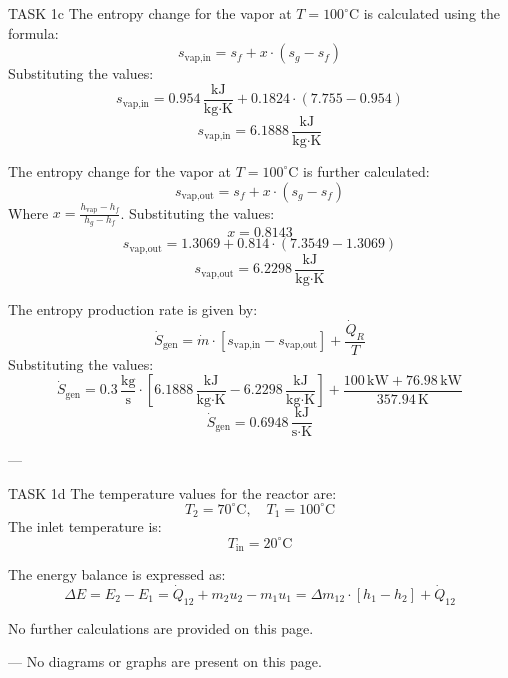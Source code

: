 TASK 1c  
The entropy change for the vapor at \( T = 100^\circ\text{C} \) is calculated using the formula:  
\[
s_{\text{vap,in}} = s_f + x \cdot (s_g - s_f)
\]  
Substituting the values:  
\[
s_{\text{vap,in}} = 0.954 \, \frac{\text{kJ}}{\text{kg·K}} + 0.1824 \cdot (7.755 - 0.954)
\]  
\[
s_{\text{vap,in}} = 6.1888 \, \frac{\text{kJ}}{\text{kg·K}}
\]  

The entropy change for the vapor at \( T = 100^\circ\text{C} \) is further calculated:  
\[
s_{\text{vap,out}} = s_f + x \cdot (s_g - s_f)
\]  
Where \( x = \frac{h_{\text{vap}} - h_f}{h_g - h_f} \). Substituting the values:  
\[
x = 0.8143
\]  
\[
s_{\text{vap,out}} = 1.3069 + 0.814 \cdot (7.3549 - 1.3069)
\]  
\[
s_{\text{vap,out}} = 6.2298 \, \frac{\text{kJ}}{\text{kg·K}}
\]  

The entropy production rate is given by:  
\[
\dot{S}_{\text{gen}} = \dot{m} \cdot \left[ s_{\text{vap,in}} - s_{\text{vap,out}} \right] + \frac{\dot{Q}_R}{T}
\]  
Substituting the values:  
\[
\dot{S}_{\text{gen}} = 0.3 \, \frac{\text{kg}}{\text{s}} \cdot \left[ 6.1888 \, \frac{\text{kJ}}{\text{kg·K}} - 6.2298 \, \frac{\text{kJ}}{\text{kg·K}} \right] + \frac{100 \, \text{kW} + 76.98 \, \text{kW}}{357.94 \, \text{K}}
\]  
\[
\dot{S}_{\text{gen}} = 0.6948 \, \frac{\text{kJ}}{\text{s·K}}
\]  

---

TASK 1d  
The temperature values for the reactor are:  
\[
T_2 = 70^\circ\text{C}, \quad T_1 = 100^\circ\text{C}
\]  
The inlet temperature is:  
\[
T_{\text{in}} = 20^\circ\text{C}
\]  

The energy balance is expressed as:  
\[
\Delta E = E_2 - E_1 = \dot{Q}_{12} + m_2 u_2 - m_1 u_1 = \Delta m_{12} \cdot \left[ h_1 - h_2 \right] + \dot{Q}_{12}
\]  

No further calculations are provided on this page.  

---  
No diagrams or graphs are present on this page.